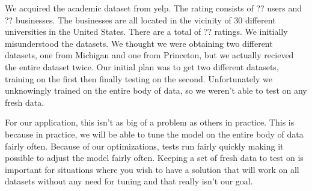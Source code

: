 We acquired the academic dataset from yelp. The rating consists of ?? users and
?? businesses. The businesses are all located in the vicinity of $30$ different
universities in the United States. There are a total of ?? ratings. We initially
misunderstood the datasets. We thought we were obtaining two different
datasets, one from Michigan and one from Princeton, but we actually recieved the
entire dataset twice. Our initial plan was to get two different datasets,
training on the first then finally testing on the second. Unfortunately we
unknowingly trained on the entire body of data, so we weren't able to test on
any fresh data. 

For our application, this isn't as big of a problem as others in practice. This
is because in practice, we will be able to tune the model on the entire body of
data fairly often. Because of our optimizations, tests run fairly quickly making
it possible to adjust the model fairly often. Keeping a set of fresh data to
test on is important for situations where you wish to have a solution that will
work on all datasets without any need for tuning and that really isn't our goal.

